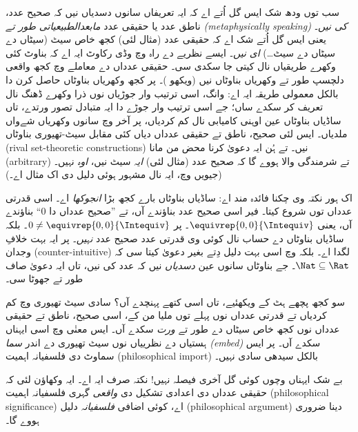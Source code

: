 \documentclass[../../../include/open-logic-section]{subfiles}
\begin{document}
سب توں ودھ شک ایس گل اُتے اے کہ ایہ تعریفاں سانوں دسدیاں نیں کہ صحیح
عدد، ناطق عدد یا حقیقی عدد \emph{مابعدالطبیعیاتی طور تے (metaphysically
speaking)} \emph{کی نیں}۔
یعنی ایس گل اُتے شک اے کہ حقیقی عدد (مثال لئی) کجھ خاص سیٹ (سیٹاں دے
سیٹاں دے سیٹ\ldots) \emph{ای نیں}۔ ایسے نظریے دے راہ وچ وڈی رکاوٹ
ایہ اے کہ بناوٹ کئی وکھرے طریقیاں نال کیتی جا سکدی سی۔ حقیقی عدداں دے
معاملے وچ کجھ واقعی دلچسپ طور تے وکھریاں بناوٹاں نیں (ویکھو
)۔ پر کجھ وکھریاں بناوٹاں حاصل کرن دا بالکل معمولی
طریقہ ایہ اے:  وانگ، اسی ترتیب وار جوڑیاں نوں
ذرا وکھرے ڈھنگ نال تعریف کر سکدے ساں؛ جے اسی ترتیب وار جوڑے دا ایہ
متبادل تصور ورتدے، تاں ساڈیاں بناوٹاں عین اوہنی کامیابی نال کم کردیاں،
پر آخر وچ سانوں وکھریاں شےواں ملدیاں۔ ایس لئی صحیح، ناطق تے حقیقی
عدداں دیاں کئی مقابل سیٹ-تھیوری بناوٹاں (rival set-theoretic
constructions) نیں۔ تے ہُن ایہ دعویٰ کرنا محض من مانا (arbitrary) تے
شرمندگی والا ہووے گا کہ صحیح عدد (مثال لئی) \emph{ایہ}
سیٹ نیں، \emph{اوہ} نہیں۔ (جیویں  وچ، ایہ
\citealt{Benacerraf1965} نال مشہور ہوئی دلیل دی اک مثال اے۔)

اک ہور نکتہ وی چکنا فائدہ مند اے: ساڈیاں بناوٹاں بارے کجھ بڑا
\emph{انجوکھا} اے۔ اسی قدرتی عدداں توں شروع کیتا۔ فیر اسی صحیح عدد
بناؤندے آں، تے ”صحیح عدداں دا $0$“ بناؤندے آں، یعنی
$ \equivrep{0,0}{\Intequiv}$۔ پر $0 \neq
\equivrep{0,0}{\Intequiv}$۔ بلکہ ساڈیاں بناوٹاں دے حساب نال کوئی وی
قدرتی عدد صحیح عدد \emph{نہیں}۔ پر ایہ بہت خلافِ وجدان (counter-intuitive)
لگدا اے۔ بلکہ
 وچ اسی بہت دلیل دِتے بغیر دعویٰ کیتا سی کہ
$\Nat \subseteq \Rat$۔ جے بناوٹاں سانوں عین \emph{دسدیاں} نیں کہ عدد
کی نیں، تاں ایہ دعویٰ صاف طور تے جھوٹا سی۔

سو کجھ پچھے ہٹ کے ویکھئیے، تاں اسی کتھے پہنچدے آں؟ سادی سیٹ تھیوری وچ
کم کردیاں تے قدرتی عدداں نوں پہلے توں ملیا من کے، اسی صحیح، ناطق تے
حقیقی عدداں نوں کجھ خاص سیٹاں دے طور تے \emph{ورت} سکدے آں۔ ایس معنٰی
وچ اسی ایہناں ہستیاں دے نظرییاں نوں سیٹ تھیوری دے اندر \emph{سما
(embed)} سکدے آں۔ پر ایس سماوٹ دی فلسفیانہ اہمیت (philosophical
import) بالکل سیدھی سادی نہیں۔

بے شک ایہناں وچوں کوئی گل آخری فیصلہ نہیں!{} نکتہ صرف ایہ اے۔ ایہ
وکھاؤن لئی کہ حقیقی عدداں دی اعدادی تشکیل دی \emph{واقعی} گہری فلسفیانہ
اہمیت (philosophical significance) اے، کوئی اضافی \emph{فلسفیانہ}
دلیل (philosophical argument) دینا ضروری ہووے گا۔

\end{document}
